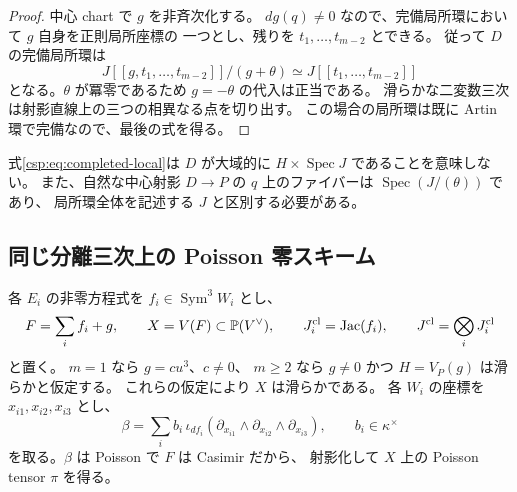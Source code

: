 \begin{proof}
中心 chart で $g$ を非斉次化する。
$dg(q)\ne0$ なので、完備局所環において $g$ 自身を正則局所座標の
一つとし、残りを $t_1,\ldots,t_{m-2}$ とできる。
従って $D$ の完備局所環は
\[
 J[[g,t_1,\ldots,t_{m-2}]]/(g+\theta)
 \simeq J[[t_1,\ldots,t_{m-2}]]
\]
となる。$\theta$ が冪零であるため $g=-\theta$ の代入は正当である。
滑らかな二変数三次は射影直線上の三つの相異なる点を切り出す。
この場合の局所環は既に Artin 環で完備なので、最後の式を得る。
\end{proof}

式\eqref{csp:eq:completed-local}は $D$ が大域的に
$H\times\operatorname{Spec}J$ であることを意味しない。
また、自然な中心射影 $D\to P$ の $q$ 上のファイバーは
$\operatorname{Spec}(J/(\theta))$ であり、
局所環全体を記述する $J$ と区別する必要がある。

\subsection{同じ分離三次上の Poisson 零スキーム}

各 $E_i$ の非零方程式を $f_i\in\operatorname{Sym}^3W_i$ とし、
\begin{equation}\label{csp:eq:commutative-target}
 F=\sum_i f_i+g,\qquad
 X=V(F)\subset\mathbb P(V^\vee),\qquad
 J_i^{\mathrm{cl}}=\operatorname{Jac}(f_i),\qquad
 J^{\mathrm{cl}}=\bigotimes_iJ_i^{\mathrm{cl}}
\end{equation}
と置く。
$m=1$ なら $g=cu^3$、$c\ne0$、
$m\ge2$ なら $g\ne0$ かつ $H=V_P(g)$ は滑らかと仮定する。
これらの仮定により $X$ は滑らかである。
各 $W_i$ の座標を $x_{i1},x_{i2},x_{i3}$ とし、
\begin{equation}\label{csp:eq:block-poisson}
 \beta=\sum_i b_i\,\iota_{df_i}
  (\partial_{x_{i1}}\wedge\partial_{x_{i2}}\wedge\partial_{x_{i3}}),
 \qquad b_i\in\kappa^\times
\end{equation}
を取る。$\beta$ は Poisson で $F$ は Casimir だから、
射影化して $X$ 上の Poisson tensor $\pi$ を得る。

